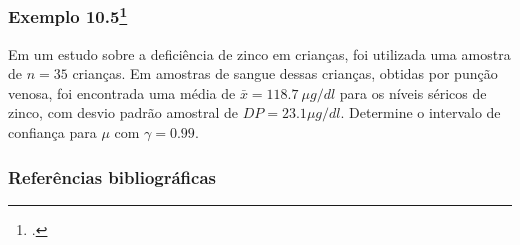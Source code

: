 \documentclass[11pt]{beamer}
\begin{document}
\begin{frame}
\frametitle{Exemplo 10.5\footcite{martinez2015bioestatistica}}
Em um estudo sobre a deficiência de zinco em crianças, foi utilizada uma amostra de \(n=35\) crianças. Em amostras de sangue dessas crianças, obtidas por punção venosa, foi encontrada uma média de \(\bar{x}=118.7\ \mu g/dl\) para os níveis séricos de zinco, com desvio padrão amostral de \(DP=23.1 \mu g/dl\). Determine o intervalo de confiança para \(\mu\) com \(\gamma=0.99\).
\vspace{1in}
\vspace{1in}

\end{frame}


\begin{frame}
\frametitle{Referências bibliográficas}
\printbibliography
\end{frame}
\end{document}

